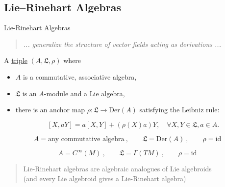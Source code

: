 \documentclass[beamer,10pt]{standalone}
\begin{document}
\checkpoint


\subsection{Lie--Rinehart Algebras}

\begin{frame}{Lie-Rinehart Algebras}
  
  \begin{quote}
    \centering
    \emph{... generalize the structure of vector fields acting as derivations ...}
  \end{quote}
 
  \begin{defblock}
    A \underline{triple} $(A,\mathfrak{L},\rho)$ where
    \begin{itemize}[label=$\triangleright$]
      \item $A$ is a commutative, associative algebra,
      \item $\mathfrak{L}$ is an $A$-module and a Lie algebra,
      \item there is an anchor map $\rho: \mathfrak{L} \to \mathrm{Der}(A)$ satisfying the Leibniz rule:
      
      \vspace{-.5em}
        $$
          [X, aY] = a[X,Y] + (\rho(X)a)Y, \quad \forall X,Y \in \mathfrak{L}, a \in A.
        $$
    \end{itemize}

  \end{defblock}  
  \pause\vfill

  \begin{exblock}[Derivations]
    $$
      A=\text{any commutative algebra}~, \qquad \mathfrak{L}=\mathrm{Der}(A)~,\qquad \rho=\mathrm{id}
    $$ 
  \end{exblock}
  \pause\vfill

  \begin{exblock}
    $$
      A=C^\infty(M)~,  \qquad \mathfrak{L}=\Gamma(TM)~,\qquad \rho=\mathrm{id}
    $$ 
    \begin{quotation}
      \centering
      Lie-Rinehart algebras are algebraic analogues of Lie algebroids
      \\
      (and every Lie algebroid gives a Lie-Rinehart algebra)
    \end{quotation} 
  \end{exblock}
  \vfill

\end{frame}
\end{document}
